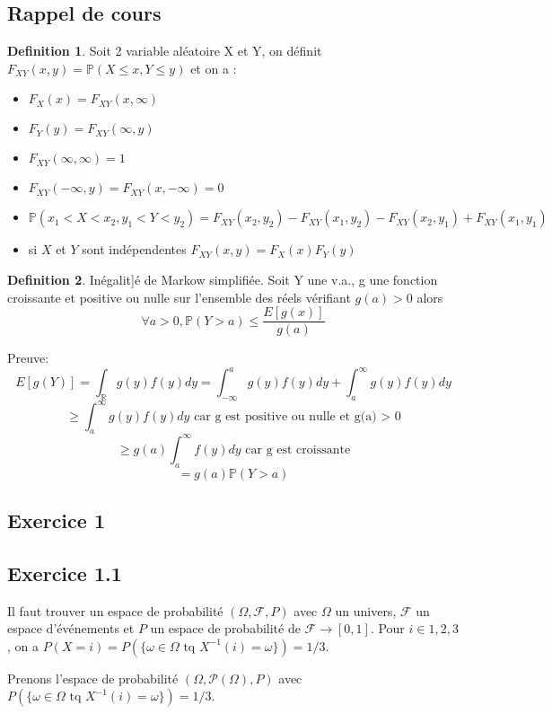 \documentclass[]{book}
\theoremstyle{definition}
\newtheorem{defn}{Definition}
\newcommand{\bb}[1]{\mathbb{#1}}
\newcommand{\R}{\bb{R}}
\newcommand{\Pe}{\bb{P}}
\begin{document}
\subsection*{Rappel de cours}
\begin{defn}
Soit 2 variable al\'eatoire X et Y, on d\'efinit $F_{XY}(x,y) = \Pe(X \leq x, Y \leq y)$ et on a :
\begin{itemize}
\item $F_X(x) = F_{XY}(x,\infty)$
\item $F_Y(y) = F_{XY}(\infty,y)$
\item $F_{XY}(\infty, \infty)= 1$
\item $F_{XY}(-\infty, y)= F_{XY}(x,-\infty)  = 0$
\item $\Pe(x_1 < X < x_2, y_1 < Y < y_2) = F_{XY}(x_2,y_2) - F_{XY}(x_1,y_2) - F_{XY}(x_2,y_1) + F_{XY}(x_1,y_1)$
\item si $X$ et $Y$ sont ind\'ependentes $F_{XY}(x,y) = F_X(x)F_Y(y)$
\end{itemize}
\end{defn}


\begin{defn}
In\'egalit]\'e de Markow simplifi\'ee. Soit Y une v.a., g une fonction croissante et positive ou nulle sur l'ensemble des r\'eels v\'erifiant $g(a) > 0$ alors 
$$
\forall a > 0, \Pe(Y>a) \leq \frac{E[g(x)]}{g(a)}
$$

Preuve:
$$
E[g(Y)] = \int_{\R}{g(y)f(y)dy} = \int_{-\infty}^{a}{g(y)f(y)dy} + \int_{a}^{\infty}{g(y)f(y)dy}
$$
$$
\geq \int_{a}^{\infty}{g(y)f(y)dy} \text{ car g est positive ou nulle et g(a) > 0}
$$
$$
\geq g(a)\int_{a}^{\infty}{f(y)dy} \text{ car g est croissante}
$$
$$
= g(a) \Pe(Y > a)
$$

\end{defn}


\newpage
\subsection*{Exercice 1}
\subsection*{Exercice 1.1}
Il faut trouver un espace de probabilit\'e $(\Omega, \mathcal{F}, P)$ avec $\Omega$ un univers, $\mathcal{F}$ un espace d'\'ev\'enements et $P$ un espace de probabilit\'e de $\mathcal{F} \to [0,1]$.
Pour $i \in {1,2,3}$, on a $P(X=i) = P(\{\omega \in \Omega \text{ tq } X^{-1}(i) = \omega\}) = 1/3$.  

Prenons l'espace de probabilit\'e $(\Omega, \mathcal{P}(\Omega), P)$ avec $P(\{\omega \in \Omega \text{ tq } X^{-1}(i) = \omega\}) = 1/3$.
\end{document}
